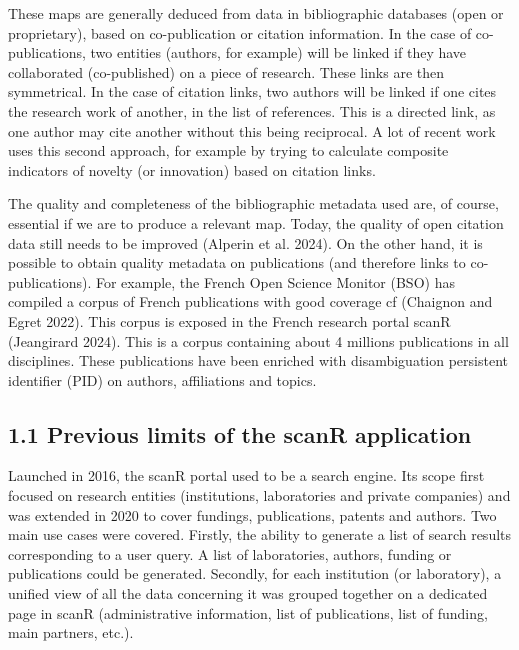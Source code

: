 \documentclass[
]{article}
\begin{document}
These maps are generally deduced from data in bibliographic databases
(open or proprietary), based on co-publication or citation information.
In the case of co-publications, two entities (authors, for example) will
be linked if they have collaborated (co-published) on a piece of
research. These links are then symmetrical. In the case of citation
links, two authors will be linked if one cites the research work of
another, in the list of references. This is a directed link, as one
author may cite another without this being reciprocal. A lot of recent
work uses this second approach, for example by trying to calculate
composite indicators of novelty (or innovation) based on citation links.

The quality and completeness of the bibliographic metadata used are, of
course, essential if we are to produce a relevant map. Today, the
quality of open citation data still needs to be improved (Alperin et al.
2024). On the other hand, it is possible to obtain quality metadata on
publications (and therefore links to co-publications). For example, the
French Open Science Monitor (BSO) has compiled a corpus of French
publications with good coverage cf (Chaignon and Egret 2022). This
corpus is exposed in the French research portal scanR (Jeangirard 2024).
This is a corpus containing about 4 millions publications in all
disciplines. These publications have been enriched with disambiguation
persistent identifier (PID) on authors, affiliations and topics.

\hypertarget{previous-limits-of-the-scanr-application}{%
\subsection{1.1 Previous limits of the scanR
application}\label{previous-limits-of-the-scanr-application}}

Launched in 2016, the scanR portal used to be a search engine. Its scope
first focused on research entities (institutions, laboratories and
private companies) and was extended in 2020 to cover fundings,
publications, patents and authors. Two main use cases were covered.
Firstly, the ability to generate a list of search results corresponding
to a user query. A list of laboratories, authors, funding or
publications could be generated. Secondly, for each institution (or
laboratory), a unified view of all the data concerning it was grouped
together on a dedicated page in scanR (administrative information, list
of publications, list of funding, main partners, etc.).
\end{document}
